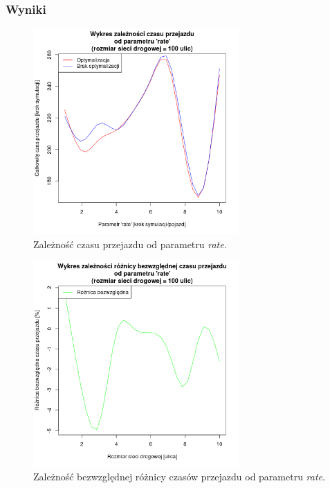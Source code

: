 \documentclass[11pt,a4paper]{article}
\begin{document}
\subsubsection{Wyniki}



\begin{figure}[H]
	\centering
		\includegraphics[width=0.7\textwidth]{../images/simulation4}
	\caption{Zależność czasu przejazdu od parametru \textit{rate}.}
\end{figure}


\begin{figure}[H]
	\centering
		\includegraphics[width=0.7\textwidth]{../images/simulation4_diff}
	\caption{Zależność bezwzględnej różnicy czasów przejazdu od parametru \textit{rate}.}
\end{figure}
\end{document}
